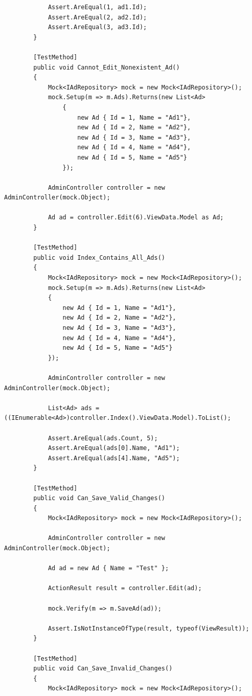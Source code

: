 \documentclass[14pt,a4paper]{extreport}
\begin{document}
\begin{lstlisting}
            Assert.AreEqual(1, ad1.Id);
            Assert.AreEqual(2, ad2.Id);
            Assert.AreEqual(3, ad3.Id);
        }

        [TestMethod]
        public void Cannot_Edit_Nonexistent_Ad()
        {
            Mock<IAdRepository> mock = new Mock<IAdRepository>();
            mock.Setup(m => m.Ads).Returns(new List<Ad>
                {
                    new Ad { Id = 1, Name = "Ad1"},
                    new Ad { Id = 2, Name = "Ad2"},
                    new Ad { Id = 3, Name = "Ad3"},
                    new Ad { Id = 4, Name = "Ad4"},
                    new Ad { Id = 5, Name = "Ad5"}
                });

            AdminController controller = new AdminController(mock.Object);

            Ad ad = controller.Edit(6).ViewData.Model as Ad;            
        }

        [TestMethod]
        public void Index_Contains_All_Ads()
        {
            Mock<IAdRepository> mock = new Mock<IAdRepository>();
            mock.Setup(m => m.Ads).Returns(new List<Ad>
            {
                new Ad { Id = 1, Name = "Ad1"},
                new Ad { Id = 2, Name = "Ad2"},
                new Ad { Id = 3, Name = "Ad3"},
                new Ad { Id = 4, Name = "Ad4"},
                new Ad { Id = 5, Name = "Ad5"}
            });

            AdminController controller = new AdminController(mock.Object);

            List<Ad> ads = ((IEnumerable<Ad>)controller.Index().ViewData.Model).ToList();

            Assert.AreEqual(ads.Count, 5);
            Assert.AreEqual(ads[0].Name, "Ad1");
            Assert.AreEqual(ads[4].Name, "Ad5");
        }

        [TestMethod]
        public void Can_Save_Valid_Changes()
        {
            Mock<IAdRepository> mock = new Mock<IAdRepository>();

            AdminController controller = new AdminController(mock.Object);

            Ad ad = new Ad { Name = "Test" };

            ActionResult result = controller.Edit(ad);

            mock.Verify(m => m.SaveAd(ad));

            Assert.IsNotInstanceOfType(result, typeof(ViewResult));
        }

        [TestMethod]
        public void Can_Save_Invalid_Changes()
        {
            Mock<IAdRepository> mock = new Mock<IAdRepository>();


\end{lstlisting}
\end{document}
